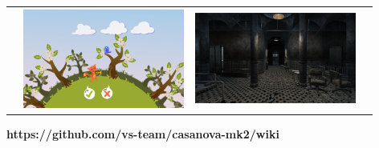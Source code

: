 \documentclass{beamer}
\begin{document}
\begin{frame}[fragile]{\CurrentSection}
\begin{block}{\CurrentSubSection}
\begin{table}[h!]
\begin{tabular}{ m{2cm} m{2cm} m{2cm} m{2cm} }
\begin{minipage}{.23\textwidth}
    \end{minipage}
    &     
    \begin{minipage}{.23\textwidth}
      \includegraphics[width=\linewidth]{Figures/g}
    \end{minipage}
    &
    \begin{minipage}{.23\textwidth}
      \includegraphics[width=\linewidth]{Figures/h}
    \end{minipage}
    \\ 
    
  \end{tabular}
\end{table}
\centering
\textbf{https://github.com/vs-team/casanova-mk2/wiki}
\end{block}
\end{frame}
\end{document}

